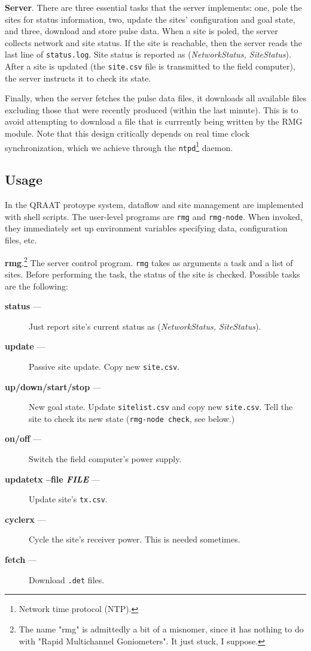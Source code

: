 \documentclass[letter]{article}
\newcounter{foot}
\begin{document}
\textbf{Server}. There are three essential tasks that the server implements: one, pole the 
sites for status information, two, update the sites' configuration and goal state, and three,
download and store pulse data. When a site is poled, the server collects network and site status. 
If the site is reachable, then the server reads the last line of \texttt{status.log}. Site status
is reported as (\textit{NetworkStatus, SiteStatus}). After a site is updated (the \texttt{site.csv} 
file is transmitted to the field computer), the server instructs it to check its state. 
   
Finally, when the server fetches the pulse data files, it downloads all available files excluding 
those that were recently produced (within the last minute). This is to avoid attempting to download 
a file that is currrently being written by the RMG module. Note that this design critically depends 
on real time clock synchronization, which we achieve through the \texttt{ntpd}\footnote{Network time 
protocol (NTP).} daemon. 

\subsection{Usage}
In the QRAAT protoype system, dataflow and site management are implemented with shell scripts. The
user-level programs are \texttt{rmg} and \texttt{rmg-node}. When invoked, they immediately 
set up environment variables specifying data, configuration files, etc. 

\textbf{rmg}.\footnote{The name "rmg" is admittedly a bit of a misnomer, since it 
has nothing to do with "Rapid Multichannel Goniometers". It just stuck, I suppose.} The server
control program. \texttt{rmg} takes as arguments a task and a list of sites. Before performing 
the task, the status of the site is checked. Possible tasks are the following: 
\begin{description}
  \item[\quad \textbf{status} ---] Just report site's current status as (\textit{NetworkStatus, SiteStatus}).
  \item[\quad \textbf{update} ---] Passive site update. Copy new \texttt{site.csv}. 
  \item[\quad \textbf{up/down/start/stop} ---] New goal state. Update \texttt{sitelist.csv} and copy new 
    \texttt{site.csv}. Tell the site to check its new state (\texttt{rmg-node check}, see below.) 
  \item[\quad \textbf{on/off} ---] Switch the field computer's power supply. 
  \item[\quad \textbf{updatetx --file \textit{FILE}} ---] Update site's \texttt{tx.csv}.
  \item[\quad \textbf{cyclerx} ---] Cycle the site's receiver power. This is needed sometimes. 
  \item[\quad \textbf{fetch} ---] Download \texttt{.det} files.  
\end{description}
\end{document}
